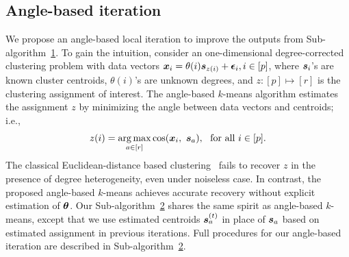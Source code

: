 \documentclass[lettersize,journal]{IEEEtran}
\theoremstyle{definition}
\theoremstyle{definition}
\newcommand{\of}[1]{\left(#1\right)}
\begin{document}
\subsection{Angle-based iteration}
We propose an angle-based local iteration to improve the outputs from Sub-algorithm~\hyperref[alg:main]{1}. To gain the intuition, consider an one-dimensional degree-corrected clustering problem with data vectors $\bm x_i = \theta(i) \bm{s}_{z(i)} + \boldsymbol{\epsilon}_i, i \in [p]$, where $\bm{s}_i$'s are known cluster centroids, $\theta(i)$'s are unknown degrees, and $z\colon [p] \mapsto [r]$ is the clustering assignment of interest. The angle-based $k$-means algorithm estimates the assignment $z$ by minimizing the angle between data vectors and centroids; i.e., 
 \begin{equation}\label{eq:angle_kmeans}
     z(i) = \argmax_{a \in [r]} \cos ( \mx_i,\ \ms_{a} ),\ \text{ for all }i \in [p].
 \end{equation}
The classical Euclidean-distance based clustering~\citep{han2020exact} fails to recover $z$ in the presence of degree heterogeneity, even under noiseless case. In contrast, the proposed angle-based $k$-means achieves accurate recovery without explicit estimation of $\boldsymbol{\theta}$. Our Sub-algorithm~\hyperref[alg:main]{2} shares the same spirit as angle-based $k$-means, except that we use estimated centroids $\bm{s}^{(t)}_a$ in place of $\bm{s}_a$ based on estimated assignment in previous iterations. 
Full procedures for our angle-based iteration are described in Sub-algorithm~\hyperref[alg:main]{2}. 
\end{document}
